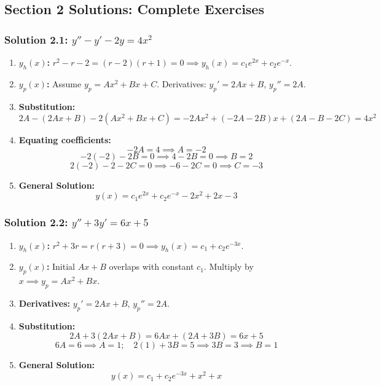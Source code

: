 \documentclass[11pt,letterpaper]{article}
\begin{document}
\newpage
\subsection*{Section 2 Solutions: Complete Exercises}

\subsubsection*{Solution 2.1: $y'' - y' - 2y = 4x^2$}
\begin{enumerate}
    \item \textbf{$y_h(x)$:} $r^2 - r - 2 = (r-2)(r+1) = 0 \implies y_h(x) = c_1 e^{2x} + c_2 e^{-x}$.
    \item \textbf{$y_p(x)$:} Assume $y_p = A x^2 + B x + C$. Derivatives: $y_p' = 2Ax + B$, $y_p'' = 2A$.
    \item \textbf{Substitution:}
    \[ 2A - (2Ax + B) - 2(Ax^2 + Bx + C) = -2A x^2 + (-2A - 2B)x + (2A - B - 2C) = 4x^2 \]
    \item \textbf{Equating coefficients:}
    \[ -2A = 4 \implies A = -2 \]
    \[ -2(-2) - 2B = 0 \implies 4 - 2B = 0 \implies B = 2 \]
    \[ 2(-2) - 2 - 2C = 0 \implies -6 - 2C = 0 \implies C = -3 \]
    \item \textbf{General Solution:}
    \[ y(x) = c_1 e^{2x} + c_2 e^{-x} - 2x^2 + 2x - 3 \]
\end{enumerate}

\subsubsection*{Solution 2.2: $y'' + 3y' = 6x + 5$}
\begin{enumerate}
    \item \textbf{$y_h(x)$:} $r^2 + 3r = r(r+3) = 0 \implies y_h(x) = c_1 + c_2 e^{-3x}$.
    \item \textbf{$y_p(x)$:} Initial $A x + B$ overlaps with constant $c_1$. Multiply by $x \implies y_p = A x^2 + B x$.
    \item \textbf{Derivatives:} $y_p' = 2Ax + B$, $y_p'' = 2A$.
    \item \textbf{Substitution:}
    \[ 2A + 3(2Ax + B) = 6Ax + (2A + 3B) = 6x + 5 \]
    \[ 6A = 6 \implies A = 1; \quad 2(1) + 3B = 5 \implies 3B = 3 \implies B = 1 \]
    \item \textbf{General Solution:}
    \[ y(x) = c_1 + c_2 e^{-3x} + x^2 + x \]
\end{enumerate}
\end{document}
